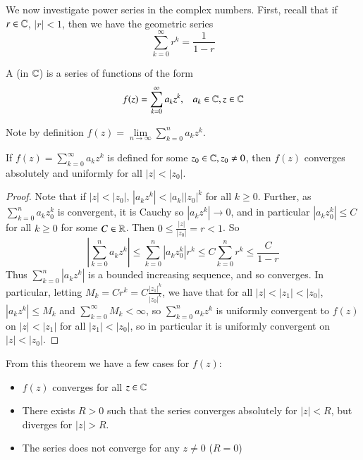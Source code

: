 We now investigate power series in the complex numbers. First, recall that if $r \in \mathbb C$, $|r| < 1$, then we have the geometric series \begin{equation*}
    \sum_{k=0}^{\infty}r^k = \frac{1}{1-r}
\end{equation*}

\begin{defn}
    A  (in $\mathbb C$) is a series of functions of the form \begin{equation*}
        f(z) = \sum_{k=0}^{\infty}a_kz^k,\;\;\;a_k \in \mathbb C, z \in \mathbb C
    \end{equation*}
\end{defn}
Note by definition $f(z) = \lim\limits_{n\rightarrow \infty}\sum_{k=0}^na_kz^k$.

\begin{prop}\label{prop:3.3.1}
    If $f(z) = \sum_{k=0}^{\infty}a_kz^k$ is defined for some $z_0 \in \mathbb C, z_0 \neq 0$, then $f(z)$ converges absolutely and uniformly for all $|z| < |z_0|$.
\end{prop}
\begin{proof}
    Note that if $|z| < |z_0|$, $|a_kz^k| < |a_k||z_0|^k$ for all $k \geq 0$. Further, as $\sum_{k=0}^na_kz_0^k$ is convergent, it is Cauchy so $|a_kz^k|\rightarrow 0$, and in particular $|a_kz_0^k| \leq C$ for all $ k\geq 0$ for some $C \in \mathbb R$. Then $0 \leq \frac{|z|}{|z_0|} = r < 1$. So $$\left|\sum_{k=0}^na_kz^k\right| \leq \sum_{k=0}^n|a_kz_0^k|r^k \leq C\sum_{k=0}^nr^k \leq \frac{C}{1-r}$$ Thus $\sum_{k=0}^n|a_kz^k|$ is a bounded increasing sequence, and so converges. In particular, letting $M_k = Cr^k = C\frac{|z_1|^k}{|z_0|^k}$, we have that for all $|z| < |z_1| < |z_0|$, $|a_kz^k| \leq M_k$ and $\sum_{k=0}^{\infty}M_k < \infty$, so $\sum_{k=0}^na_kz^k$ is uniformly convergent to $f(z)$ on $|z| < |z_1|$ for all $|z_1| < |z_0|$, so in particular it is uniformly convergent on $|z| < |z_0|$.
\end{proof}

From this theorem we have a few cases for $f(z)$: \begin{itemize}
    \item $f(z)$ converges for all $z \in \mathbb C$
    \item There exists $R  > 0$ such that the series converges absolutely for $|z| < R$, but diverges for $|z| > R$.
    \item The series does not converge for any $z \neq 0$ ($R = 0$)
\end{itemize}

